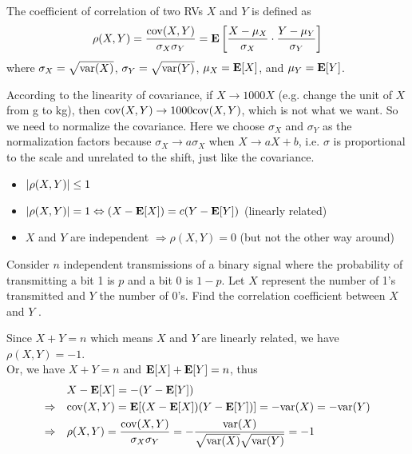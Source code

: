 \documentclass[device=normal, lang=en]{elegantbook}
\numberwithin{equation}{section}
\begin{document}
\begin{definition}
    The coefficient of correlation of two RVs $X$ and $Y$ is defined as
    \begin{equation}
        \rho(X, Y) = \frac{\mathrm{cov}(X, Y)}{\sigma_X\sigma_Y} = \mathbf{E}\left[\frac{X - \mu_X}{\sigma_X} \cdot \frac{Y - \mu_Y}{\sigma_Y}\right]
    \end{equation}
    where $\sigma_X = \sqrt{\mathrm{var}(X)}$, $\sigma_Y = \sqrt{\mathrm{var}(Y)}$, $\mu_X = \mathbf{E}[X]$, and $\mu_Y = \mathbf{E}[Y]$. 
\end{definition}
According to the linearity of covariance, if $X \to 1000X$ (e.g. change the unit of $X$ from g to kg), then $\mathrm{cov}(X, Y) \to 1000 \mathrm{cov}(X, Y)$, which is not what we want. So we need to normalize the covariance. Here we choose $\sigma_X$ and $\sigma_Y$ as the normalization factors because $\sigma_X \to a\sigma_X$ when $X \to aX + b$, i.e. $\sigma$ is proportional to the scale and unrelated to the shift, just like the covariance.
\begin{property}
    \begin{itemize}
        \item $\abs{\rho(X, Y)} \leq 1$
        \item $\abs{\rho(X, Y)} = 1 \Leftrightarrow (X - \mathbf{E}[X]) = c(Y - \mathbf{E}[Y])$ (linearly related)
        \item $X$ and $Y$ are independent $\Rightarrow \rho(X, Y) = 0$ (but not the other way around)
    \end{itemize}
\end{property}

\begin{example}
    Consider $n$ independent transmissions of a binary signal where the probability of transmitting a bit 1 is $p$ and a bit 0 is $1 - p$. Let $X$ represent the number of 1's transmitted and $Y$ the number of 0's. Find the correlation coefficient between $X$ and $Y$ .
\end{example}
\begin{solution}
    Since $X + Y = n$ which means $X$ and $Y$ are linearly related, we have $\rho(X, Y) = -1$. \\ 
    Or, we have $X + Y = n$ and $\mathbf{E}[X] + \mathbf{E}[Y] = n$, thus
    \begin{equation}
    \begin{aligned}
        &X - \mathbf{E}[X] = -(Y - \mathbf{E}[Y]) \\ 
        \Rightarrow \quad &\mathrm{cov}(X, Y) = \mathbf{E}[(X - \mathbf{E}[X])(Y - \mathbf{E}[Y])] = -\mathrm{var}(X) = -\mathrm{var}(Y) \\ 
        \Rightarrow \quad &\rho(X, Y) = \frac{\mathrm{cov}(X, Y)}{\sigma_X \sigma_Y} = -\frac{\mathrm{var}(X)}{\sqrt{\mathrm{var}(X)}\sqrt{\mathrm{var}(Y)}} = -1
    \end{aligned}
    \end{equation}
\end{solution}
\end{document}
